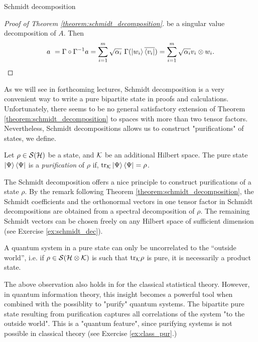 \begin{subsection}{Schmidt decomposition}
\begin{proof}[Proof of Theorem \ref{theorem:schmidt_decomposition}]
	 be a singular value decomposition of $A$. Then 
	 \begin{align*}
	  a \ = \Gamma \circ \Gamma^{-1} a = \sum_{i=1}^m \sqrt{\alpha_i} \ \Gamma(\ket{w_i}\overline{\bra{v_i}}) = \sum_{i=1}^m \sqrt{\alpha_i} v_i \otimes w_i.
	 \end{align*}
    \end{proof}
	As we will see in forthcoming lectures, Schmidt decomposition is a very convenient way to write a pure bipartite state in proofs and calculations. Unfortunately, there seems to be no general satisfactory extension of Theorem \ref{theorem:schmidt_decomposition} to spaces with more than two tensor factors. Nevertheless, Schmidt decompositions allows us to construct "purifications" of states, we define.
	\begin{definition}[Purification] 		
	  Let $\rho \in {\mathcal S}({\mathcal H})$ be a state, and ${\mathcal K}$ be an additional Hilbert space. The pure state $\ket{\Psi}\bra{\Psi}$ is a \emph{purification} of $\rho$ if, $\mathrm{tr}_{\mathcal K} \ket{\Psi}\bra{\Psi} = \rho$. 
	\end{definition}
	The Schmidt decomposition offers a nice principle to construct purifications of a state $\rho$. By the remark following Theorem \ref{theorem:schmidt_decomposition}, the Schmidt coefficients and the orthonormal vectors in one tensor factor in Schmidt decompositions are obtained from a spectral decomposition of $\rho$. The remaining Schmidt vectors can be chosen freely on any Hilbert space of sufficient dimension (see Exercise \ref{ex:schmidt_dec}). 
		\begin{observation} \label{obs:mon_ent}
		A quantum system in a pure state can only be uncorrelated to the ``outside world'', i.e. if $\rho \in {\mathcal S}({\mathcal H} \otimes {\mathcal K})$ is such that $\mathrm{tr}_{\mathcal K} \rho$ is pure, it is necessarily a product state.
	\end{observation}
	The above observation also holds in for the classical statistical theory. However, in quantum information theory, this insight becomes a powerful tool when combined with the possiblity to "purify" quantum systems. The bipartite pure state resulting from purification captures all correlations of the system "to the outside world". This is a "quantum feature", since purifying systems is not possible in classical theory (see Exercise \ref{ex:class_pur}.)
	\end{subsection}
